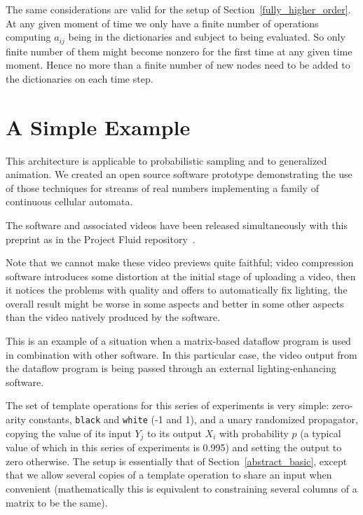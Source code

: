 \documentclass[withtimes]{easychair}
\begin{document}
The same considerations are valid for the setup of Section~\ref{fully_higher_order}. At any given moment
of time we only have a finite number of operations computing $a_{ij}$ being in the dictionaries and subject to being
evaluated. So only finite number of them might become nonzero for the first time at any given time moment.
Hence no more than a finite number of new nodes need to be added to the dictionaries on
each time step.



\section{A Simple Example}\label{simple_example}

This architecture is applicable to probabilistic sampling and to generalized animation.
We created an open source software prototype demonstrating the use
of those techniques for streams of real numbers implementing a family
of continuous cellular automata.

The software and associated videos have been released simultaneously with this
preprint as in the Project Fluid repository~\cite{Fluid}.

Note that we cannot make these video previews quite faithful; 
video compression software introduces some distortion at the initial stage of uploading a video,
then it notices the problems with quality and offers to automatically fix lighting,
the overall result might be worse in some aspects and better in some other aspects
than the video natively produced by the software.

This is an example of a situation when a matrix-based dataflow program is used
in combination with other software. In this particular case, the video output
from the dataflow program is being passed through an external
lighting-enhancing software.

The set of template operations for this series of experiments is very simple: zero-arity
constants, {\tt black} and {\tt white} (-1 and 1), and a unary randomized propagator,
copying the value of its input $Y_j$ to its output $X_i$ with probability $p$ (a typical
value of which in this series of experiments is 0.995) and setting the output to zero
otherwise. The setup is essentially that of Section~\ref{abstract_basic}, except that
we allow several copies of a template operation to share an input when convenient
(mathematically this is equivalent to constraining several columns of a matrix to be the same).
\end{document}

